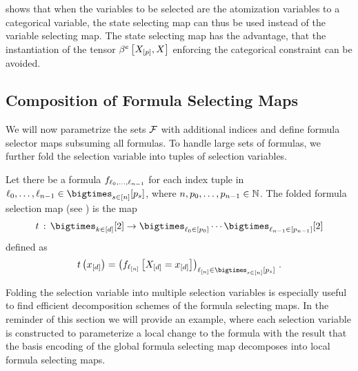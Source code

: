  shows that when the variables to be selected are the atomization variables to a categorical variable, the state selecting map can thus be used instead of the variable selecting map.
The state selecting map has the advantage, that the instantiation of the tensor $\bencodingofat{\categoricalmap}{\catvariableof{[\seldim]},\catvariable}$ enforcing the categorical constraint can be avoided.


\subsection{Composition of Formula Selecting Maps}

We will now parametrize the sets $\mathcal{F}$ with additional indices and define formula selector maps subsuming all formulas.
To handle large sets of formulas, we further fold the selection variable into tuples of selection variables.

\begin{definition}
    \label{def:formulaSelector}
    Let there be a formula $f_{\ell_{0},\ldots,\ell_{n-1}}$ for each index tuple in $\selindexlist\in\selstates$, where $n,p_{0},\ldots,p_{n-1}\in\mathbb{N}$.
    The folded formula selection map (see ) is the map
    \begin{align*}
        \fselectionmap \defcols \atomstates \rightarrow \bigtimes_{\selindexofin{0}} \cdots \bigtimes_{\selindexofin{\selorder-1}} [2]
    \end{align*}
    defined as
    \begin{align*}
        \fselectionmapat{\shortcatindices} = \left( \formulaofat{\shortselindices}{\shortcatvariables=\shortcatindices} \right)_{\shortselindices\in\selstates} \, .
    \end{align*}
\end{definition}

Folding the selection variable into multiple selection variables is especially useful to find efficient decomposition schemes of the formula selecting maps.
In the reminder of this section we will provide an example, where each selection variable is constructed to parameterize a local change to the formula with the result that the basis encoding of the global formula selecting map decomposes into local formula selecting maps.


